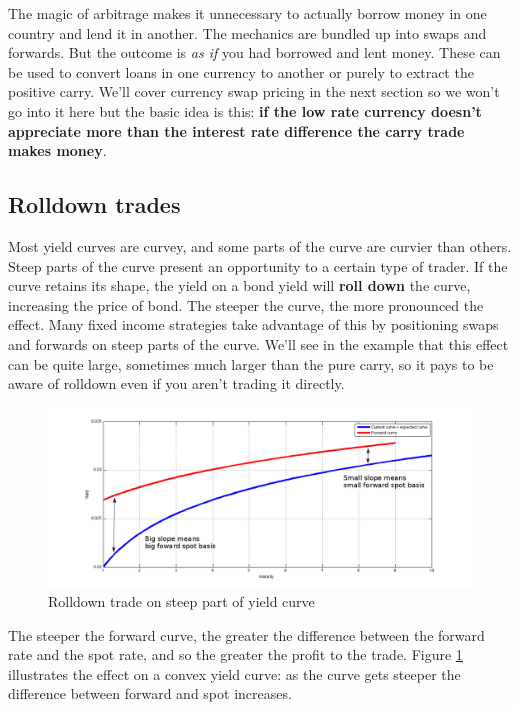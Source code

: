 The magic of arbitrage makes it unnecessary to actually borrow money in one country and lend it in another. The mechanics are bundled up into swaps and forwards. But the outcome is \textit{as if} you had borrowed and lent money. These can be used to convert loans in one currency to another or purely to extract the positive carry. We'll cover currency swap pricing in the next section so we won't go into it here but the basic idea is this: \textbf{if the low rate currency doesn't appreciate more than the interest rate difference the carry trade makes money}. 

\subsection{Rolldown trades}

Most yield curves are curvey, and some parts of the curve are curvier than others. Steep parts of the curve present an opportunity to a certain type of trader. If the curve retains its shape, the yield on a bond yield will \textbf{roll down} the curve, increasing the price of bond. The steeper the curve, the more pronounced the effect. Many fixed income strategies take advantage of this by positioning swaps and forwards on steep parts of the curve. We'll see in the example that this effect can be quite large, sometimes much larger than the pure carry, so it pays to be aware of rolldown even if you aren't trading it directly.

\begin{figure}[ht]
\centering
  \includegraphics[width=5in] {pics/rolldown}
\caption{Rolldown trade on steep part of yield curve}
\label{fig:rolldown}
\end{figure}


The steeper the forward curve, the greater the difference between the forward rate and the spot rate, and so the greater the profit to the trade. Figure \ref{fig:rolldown} illustrates the effect on a convex yield curve: as the curve gets steeper the difference between forward and spot increases. 



